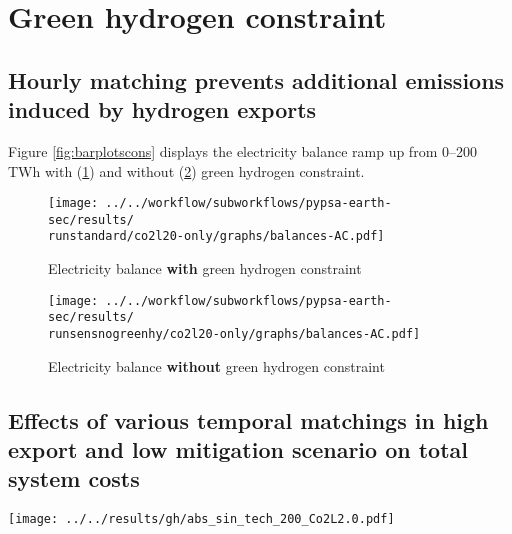 \section{Green hydrogen constraint}
\label{subsec:gh_constraint_effects}

\subsection{Hourly matching prevents additional emissions induced by hydrogen exports}
Figure \ref{fig:barplotscons} displays the electricity balance ramp up from 0--200 TWh with (\ref{fig:balances_AC_monthlymatch}) and without (\ref{fig:balances_AC_nogreen}) green hydrogen constraint.

\begin{figure*}[h!]
    \centering
    \begin{subfigure}[b]{0.49\linewidth}
        \centering
        \texttt{[image: ../../workflow/subworkflows/pypsa-earth-sec/results/\\runstandard/co2l20-only/graphs/balances-AC.pdf]}
        \caption{Electricity balance {\bf with} green hydrogen constraint}
        \label{fig:balances_AC_monthlymatch}
    \end{subfigure}
    \hfill
    \begin{subfigure}[b]{0.49\linewidth}
        \centering
        \texttt{[image: ../../workflow/subworkflows/pypsa-earth-sec/results/\\runsensnogreenhy/co2l20-only/graphs/balances-AC.pdf]}
        \caption{Electricity balance {\bf without} green hydrogen constraint}
        \label{fig:balances_AC_nogreen}
    \end{subfigure}
    \hfill
    \caption{Electricity balance ramp up from 0--200 TWh with (\ref{fig:balances_AC_monthlymatch}) and without (\ref{fig:balances_AC_nogreen}) green hydrogen constraint}
    \label{fig:barplotscons}
\end{figure*}


\subsection{Effects of various temporal matchings in high export and low mitigation scenario on total system costs}

\begin{figure*}[h]
    \centering
    \texttt{[image: ../../results/gh/abs\_sin\_tech\_200\_Co2L2.0.pdf]}
    \caption{Total system costs at 200 TWh export and 0\% domestic mitigation. Stricter hydrogen regulation mainly increases the total CAPEX of additional solar PV, electrolysis and hydrogen storage. In return, the OPEX of fossil generation (mainly gas), decreases. The large share of oil OPEX is independent of hydrogen regulation, since these costs are mainly linked to combustion engine cars with demands independent of hydrogen regulation.}
    \label{fig:tsc-200-0}
\end{figure*}




